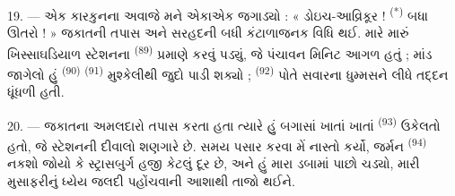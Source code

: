 \VUsaut{3.0mm}
\VUsaut{3.0mm}

19. --- એક કારકુનના અવાજે મને એકાએક જગાડ્યો : « ડોઇચ-આવ્રિકૂર !
\textsuperscript{(*)} બધા ઊતરો ! » જકાતની તપાસ અને સરહદની બધી
કંટાળાજનક વિધિ થઈ. મારે મારું ખિસ્સાઘડિયાળ સ્ટેશનના  \textsuperscript{(89)} પ્રમાણે કરવું પડ્યું, જે પંચાવન મિનિટ
આગળ હતું ; માંડ જાગેલો હું  \textsuperscript{(90)}
 \textsuperscript{(91)} મુશ્કેલીથી જુદો પાડી શક્યો ;
 \textsuperscript{(92)} પોતે સવારના ધુમ્મસને
લીધે તદ્દન ધૂંધળી હતી.

20. --- જકાતના અમલદારો તપાસ કરતા હતા ત્યારે હું બગાસાં ખાતાં ખાતાં
 \textsuperscript{(93)} ઉકેલતો હતો, જે
સ્ટેશનની દીવાલો શણગારે છે. સમય પસાર કરવા મેં નાસ્તો કર્યો, જર્મન
 \textsuperscript{(94)} નકશો જોયો કે સ્ટ્રાસબુર્ગ હજી
કેટલું દૂર છે, અને હું મારા ડબામાં પાછો ચડ્યો, મારી મુસાફરીનું ધ્યેય
જલદી પહોંચવાની આશાથી તાજો થઈને.

\VUsaut{6.0mm}
\VUfilet{22mm}
